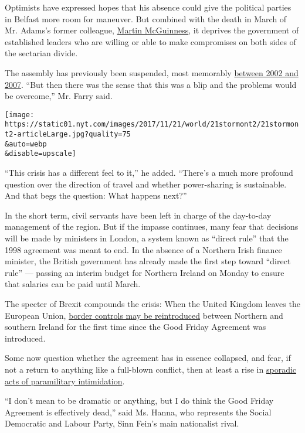 Optimists have expressed hopes that his absence could give the political
parties in Belfast more room for maneuver. But combined with the death
in March of Mr. Adams's former colleague,
\href{https://www.nytimes.com/2017/03/21/world/europe/martin-mcguinness-northern-ireland-ira.html}{Martin
McGuinness}, it deprives the government of established leaders who are
willing or able to make compromises on both sides of the sectarian
divide.

The assembly has previously been suspended, most memorably
\href{http://www.nytimes.com/2002/10/14/world/the-troubles-in-ulster-shift-from-street-to-the-assembly.html}{between
2002 and 2007}. ``But then there was the sense that this was a blip and
the problems would be overcome,'' Mr. Farry said.

\texttt{[image: https://static01.nyt.com/images/2017/11/21/world/21stormont2/21stormont2-articleLarge.jpg?quality=75\\\&auto=webp\\\&disable=upscale]}

``This crisis has a different feel to it,'' he added. ``There's a much
more profound question over the direction of travel and whether
power-sharing is sustainable. And that begs the question: What happens
next?''

In the short term, civil servants have been left in charge of the
day-to-day management of the region. But if the impasse continues, many
fear that decisions will be made by ministers in London, a system known
as ``direct rule'' that the 1998 agreement was meant to end. In the
absence of a Northern Irish finance minister, the British government has
already made the first step toward ``direct rule'' --- passing an
interim budget for Northern Ireland on Monday to ensure that salaries
can be paid until March.

The specter of Brexit compounds the crisis: When the United Kingdom
leaves the European Union,
\href{https://www.nytimes.com/2017/08/05/world/europe/brexit-northern-ireland-ireland.html}{border
controls may be reintroduced} between Northern and southern Ireland for
the first time since the Good Friday Agreement was introduced.

Some now question whether the agreement has in essence collapsed, and
fear, if not a return to anything like a full-blown conflict, then at
least a rise in
\href{https://www.nytimes.com/2017/10/11/world/europe/belfast-catholics-protestants-cantrell-close.html}{sporadic
acts of paramilitary intimidation}.

``I don't mean to be dramatic or anything, but I do think the Good
Friday Agreement is effectively dead,'' said Ms. Hanna, who represents
the Social Democratic and Labour Party, Sinn Fein's main nationalist
rival.

